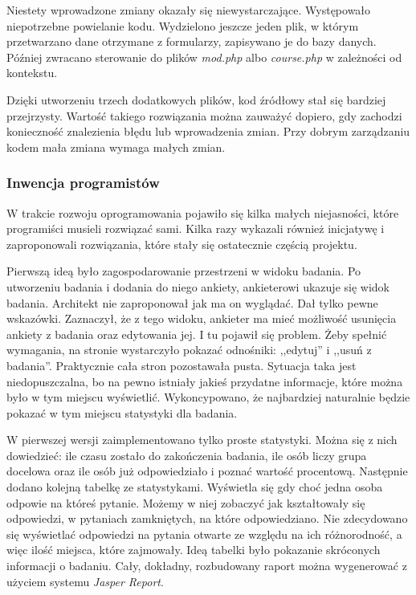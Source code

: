 Niestety wprowadzone zmiany okazały się niewystarczające. Występowało niepotrzebne powielanie kodu. Wydzielono jeszcze jeden plik, w którym przetwarzano dane otrzymane z formularzy, zapisywano je do bazy danych. Później zwracano sterowanie do plików \emph{mod.php} albo \emph{course.php} w zależności od kontekstu.

Dzięki utworzeniu trzech dodatkowych plików, kod źródłowy stał się bardziej przejrzysty. Wartość takiego rozwiązania można zauważyć dopiero, gdy zachodzi konieczność znalezienia błędu lub wprowadzenia zmian. Przy dobrym zarządzaniu kodem mała zmiana wymaga małych zmian.

\subsubsection{Inwencja programistów}

W trakcie rozwoju oprogramowania pojawiło się kilka małych niejasności, które programiści musieli rozwiązać sami. Kilka razy wykazali również inicjatywę i zaproponowali rozwiązania, które stały się ostatecznie częścią projektu.

Pierwszą ideą było zagospodarowanie przestrzeni w widoku badania. Po utworzeniu badania i dodania do niego ankiety, ankieterowi ukazuje się widok badania. Architekt nie zaproponował jak ma on wyglądać. Dał tylko pewne wskazówki. Zaznaczył, że z tego widoku, ankieter ma mieć możliwość usunięcia ankiety z badania oraz edytowania jej. I tu pojawił się problem. Żeby spełnić wymagania, na stronie wystarczyło pokazać odnośniki: ,,edytuj'' i ,,usuń z badania''. Praktycznie cała stron pozostawała pusta. Sytuacja taka jest niedopuszczalna, bo na pewno istniały jakieś przydatne informacje, które można było w tym miejscu wyświetlić. Wykoncypowano, że najbardziej naturalnie będzie pokazać w tym miejscu statystyki dla badania.

W pierwszej wersji zaimplementowano tylko proste statystyki. Można się z nich dowiedzieć: ile czasu zostało do zakończenia badania, ile osób liczy grupa docelowa oraz ile osób już odpowiedziało i poznać wartość procentową. Następnie dodano kolejną tabelkę ze statystykami. Wyświetla się gdy choć jedna osoba odpowie na któreś pytanie. Możemy w niej zobaczyć jak kształtowały się odpowiedzi, w pytaniach zamkniętych, na które odpowiedziano. Nie zdecydowano się wyświetlać odpowiedzi na pytania otwarte ze względu na ich różnorodność, a więc ilość miejsca, które zajmowały. Ideą tabelki było pokazanie skróconych informacji o badaniu. Cały, dokładny, rozbudowany raport można wygenerować z użyciem systemu \emph{Jasper Report}.

